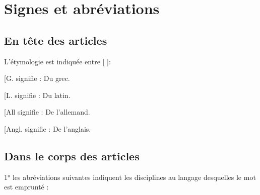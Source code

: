 \section{Signes et abréviations}
\subsection {En tête des articles}
L’étymologie est indiquée entre [ ]:

\hfill
\begin{minipage}[c]{.45\linewidth}
[G. signifie : Du grec.

[L. signifie : Du latin.
\end{minipage}
\hfill
\begin{minipage}[c]{.45\linewidth}
[All signifie : De l'allemand.

[Angl. signifie : De l’anglais.
\end{minipage}

\vspace{0.311cm}

\subsection {Dans le corps des articles}
1° les abréviations suivantes indiquent les
disciplines au langage desquelles le mot est emprunté :

